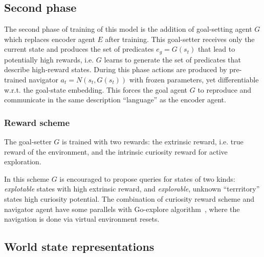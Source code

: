\documentclass[acmsmall, nonacm]{acmart}
\begin{document}

\subsection{Second phase}

The second phase of training of this model is the addition of goal-setting agent $G$ which replaces encoder agent $E$ after training.
%
This goal-setter receives only the current state and produces the set of predicates $e_g = G(s_t)$ that lead to potentially high rewards, i.e. $G$ learns to generate the set of predicates that describe high-reward states. During this phase actions are produced by pre-trained navigator $a_t = N(s_t, G(s_t))$ with frozen parameters, yet differentiable w.r.t. the goal-state embedding. This forces the goal agent $G$ to reproduce and communicate in the same description ``language'' as the encoder agent.


\subsubsection{Reward scheme}

The goal-setter $G$ is trained with two rewards: the extrinsic reward, i.e. true reward of the environment, and the intrinsic curiosity reward for active exploration.

In this scheme $G$ is encouraged to propose queries for states of two kinds: \emph{explotable} states with high extrinsic reward, and \emph{explorable}, unknown ``terrritory'' states high curiosity potential.
%
The combination of curiosity reward scheme and navigator agent have some parallels with Go-explore algorithm~\citep{ecoffet_first_2021}, where the navigation is done via virtual environment resets.


\subsection{World state representations}
\end{document}
